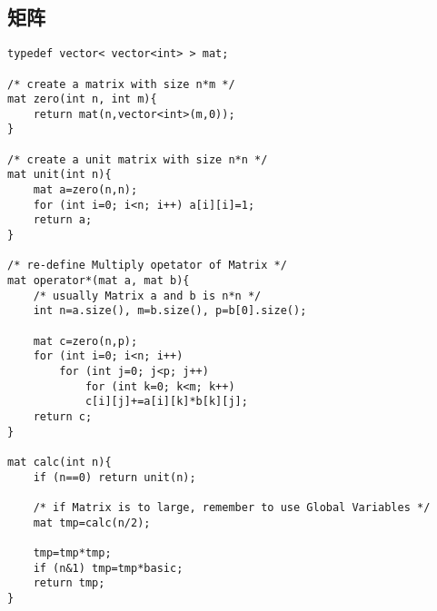 \subsection{矩阵}
\begin{verbatim}
typedef vector< vector<int> > mat;

/* create a matrix with size n*m */
mat zero(int n, int m){
    return mat(n,vector<int>(m,0));
}

/* create a unit matrix with size n*n */
mat unit(int n){
    mat a=zero(n,n);
    for (int i=0; i<n; i++) a[i][i]=1;
    return a;
}

/* re-define Multiply opetator of Matrix */
mat operator*(mat a, mat b){
    /* usually Matrix a and b is n*n */
    int n=a.size(), m=b.size(), p=b[0].size();

    mat c=zero(n,p);
    for (int i=0; i<n; i++)
        for (int j=0; j<p; j++)
            for (int k=0; k<m; k++)
	        c[i][j]+=a[i][k]*b[k][j];
    return c;
}

mat calc(int n){
    if (n==0) return unit(n);

    /* if Matrix is to large, remember to use Global Variables */
    mat tmp=calc(n/2);

    tmp=tmp*tmp;
    if (n&1) tmp=tmp*basic;
    return tmp;
}


\end{verbatim} 
